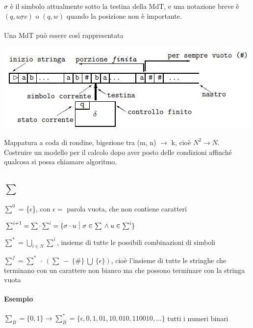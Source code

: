 \documentclass[10pt]{book}
\begin{document}
$\sigma$ è il simbolo attualmente sotto la testina della MdT, e una notazione breve è $(q, u\underline{\sigma}v)$ o $(q,w)$ quando la posizione non è importante.\\\\
Una MdT può essere così rappresentata
\begin{center}
	\includegraphics[scale=0.75]{mdt.png}
\end{center}
Mappatura a coda di rondine, bigezione tra (m, n) $\rightarrow$ k, cioè $N^2 \rightarrow N$.\\
Costruire un modello per il calcolo dopo aver posto delle condizioni affinché qualcosa si possa chiamare algoritmo.

\subsection{$\sum$}
\begin{list}{}{}
	\item $\sum^0$ = \{$\epsilon$\}, con $\epsilon =$ parola vuota, che non contiene caratteri
	\item $\sum^{i+1} = \sum \cdot \sum^i = \{\sigma \cdot u \:\:\vline\:\: \sigma \in \sum \:\wedge\: u \in \sum^i\}$
	\item $\sum^* = \bigcup_{i \in N}\sum^i$, insieme di tutte le possibili combinazioni di simboli
	\item $\sum^f = \sum^* \:\cdot\: (\sum \:-\: \{\#\} \:\bigcup\: \{\epsilon\})$, cioè l'insieme di tutte le stringhe che terminano con un carattere non bianco ma che possono terminare con la stringa vuota
\end{list}
\paragraph{Esempio} $\sum_B = \{0, 1\} \longrightarrow \sum_B^* = \{\epsilon, 0, 1, 01, 10, 010, 110010, \ldots\}$ tutti i numeri binari
\pagebreak
\end{document}
